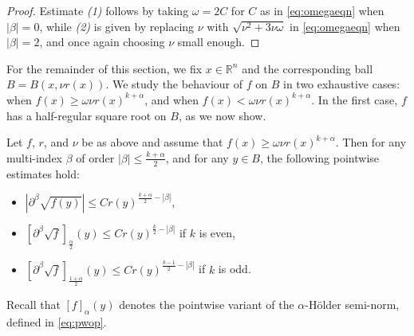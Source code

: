 \documentclass[oneside,hidelinks,indentfirst,10pt]{book}
\begin{document}
\begin{proof}
Estimate \textit{(1)} follows by taking \(\omega=2C\) for \(C\) as in \eqref{eq:omegaeqn} when \(|\beta|=0\), while \textit{(2)} is given by replacing \(\nu\) with \(\sqrt{\nu^2+3\nu\omega}\) in \eqref{eq:omegaeqn} when \(|\beta|=2\), and once again choosing \(\nu\) small enough.
\end{proof}


For the remainder of this section, we fix \(x\in\mathbb{R}^n\) and the corresponding ball \(B=B(x,\nu r(x))\). We study the behaviour of \(f\) on \(B\) in two exhaustive cases: when \(f(x)\geq \omega\nu r(x)^{k+\alpha}\), and when \(f(x)<\omega\nu r(x)^{k+\alpha}\). In the first case, \(f\) has a half-regular square root on \(B\), as we now show.


\begin{lem}\label{lem:local1}
Let \(f\), \(r\), and \(\nu\) be as above and assume that \(f(x)\geq \omega\nu r(x)^{k+\alpha}\). Then for any multi-index \(\beta\) of order \(|\beta|\leq \frac{k+\alpha}{2}\), and for any \(y\in B\), the following pointwise estimates hold:
\begin{itemize}
    \item[(1)] \(|\partial^\beta\sqrt{f(y)}|\leq Cr(y)^{\frac{k+\alpha}{2}-|\beta|}\),
    \item[(2)] \([\partial^\beta\sqrt{f}]_{\frac{\alpha}{2}}(y)\leq Cr(y)^{\frac{k}{2}-|\beta|}\) if \(k\) is even,
    \item[(3)] \([\partial^\beta\sqrt{f}]_{\frac{1+\alpha}{2}}(y)\leq Cr(y)^{\frac{k-1}{2}-|\beta|}\) if \(k\) is odd.
\end{itemize}
Recall that \([f]_\alpha(y)\) denotes the pointwise variant of the \(\alpha\)-H\"older semi-norm, defined in \eqref{eq:pwop}. 
\end{lem}
\end{document}
